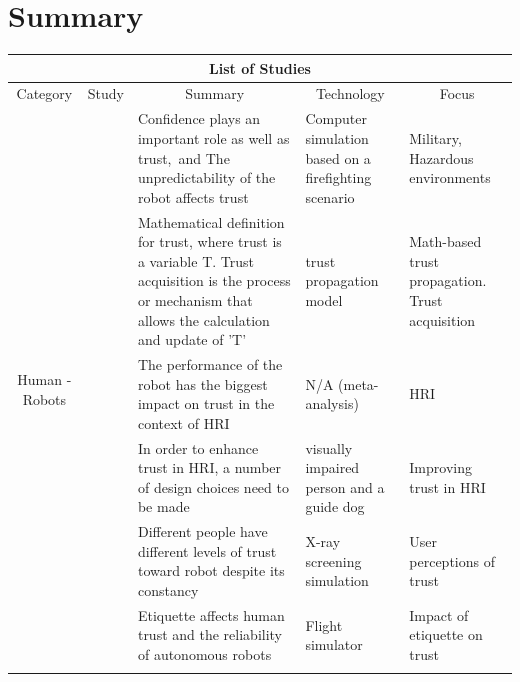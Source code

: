 \documentclass[runningheads,a4paper]{llncs}
\begin{document}
\newpage
\section{Summary}

\begin{center}
\setlength\LTleft{0pt}
\setlength\LTright{0pt}
\begin{longtable}{|c|c|p{4cm}|p{2cm}|p{2cm}|}
\hline
\multicolumn{5}{|c|}{List of Studies}                                                                                               \\ \hline
Category                        & Study & \multicolumn{1}{c|}{Summary}    & \multicolumn{1}{c|}{Technology} & \multicolumn{1}{c|}{Focus} \\ \hline
\multirow{8}{*}{Human - Robots} 
	& \cite{stormont2008analyzing}    
	&  Confidence plays an important role as well as trust,\ and The unpredictability of the robot affects trust  
	& Computer simulation based on a firefighting scenario                        
	& Military, Hazardous environments
	\\ \cline{2-5} 
	& \cite{esfandiari2001agents}     
	& Mathematical definition for trust, where trust is a variable T. Trust acquisition is the process or mechanism that allows the calculation and update of 'T'
	& trust propagation model                      
	& Math-based trust propagation. Trust acquisition
	\\ \cline{2-5} 
	& \cite{hancock2011meta}
	& The performance of the robot has the biggest impact on trust in the context of HRI
	& N/A (meta-analysis)
	& HRI
	\\ \cline{2-5}
	&  \cite{penders2013enhancing}
	& In order to enhance trust in HRI, a number of design choices need to be made
	& visually impaired person and a guide dog
	& Improving trust in HRI
	\\ \cline{2-5} 
	& \cite{merritt2008not}
	& Different people have different levels of trust toward robot despite its constancy
	& X-ray screening simulation             
	& User perceptions of trust
	\\ \cline{2-5} 
	& \cite{parasuraman2004trust}
	& Etiquette affects human trust and the reliability of autonomous robots
	& Flight simulator
	& Impact of etiquette on trust
	\\ \cline{2-5} 
	& \cite{yagoda2012you}

\end{longtable}
\end{center}
\end{document}
